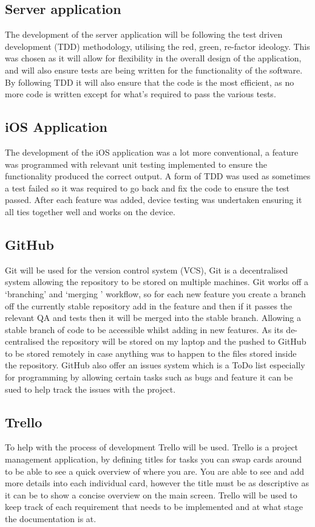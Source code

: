 	\subsection{Server application}
		The development of the server application will be following the test driven development (TDD) methodology, utilising the red, green, re-factor ideology. This was chosen as it will allow for flexibility in the overall design of the application, and will also ensure tests are being written for the functionality of the software. By following TDD it will also ensure that the code is the most efficient, as no more code is written except for what's required to pass the various tests. 

	\subsection{iOS Application}
		The development of the iOS application was a lot more conventional, a feature was programmed with relevant unit testing implemented to ensure the functionality produced the correct output. A form of TDD was used as sometimes a test failed so it was required to go back and fix the code to ensure the test passed. After each feature was added, device testing was undertaken ensuring it all ties together well and works on the device.  
	
	\subsection{GitHub}
		Git will be used for the version control system (VCS), Git is a decentralised system allowing the repository to be stored on multiple machines. Git works off a `branching' and `merging ' workflow, so for each new feature you create a branch off the currently stable repository add in the feature and then if it passes the relevant QA and tests then it will be merged into the stable branch. Allowing a stable branch of code to be accessible whilst adding in new features. As its de-centralised the repository will be stored on my laptop and the pushed to GitHub to be stored remotely in case anything was to happen to the files stored inside the repository. GitHub also offer an issues system which is a ToDo list especially for programming by allowing certain tasks such as bugs and feature it can be sued to help track the issues with the project.
		
	\subsection{Trello}
		To help with the process of development Trello will be used. Trello is a  project management application, by defining titles for tasks you can swap cards around to be able to see a quick overview of where you are. You are able to see and add more details into each individual card, however the title must be as descriptive as it can be to show a concise overview on the main screen. Trello will be used to keep track of each requirement that needs to be implemented and at what stage the documentation is at. 

